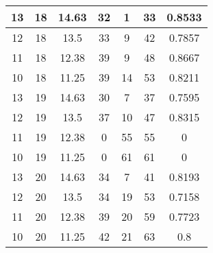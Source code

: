 \documentclass[letterpaper, 12pt]{article}
\begin{document}
\begin{longtable}{|c|c|c|c|c|c|c|}
\hline
13 & 18 & 14.63 & 32 & 1 & 33 & 0.8533 \\
\hline
12 & 18 & 13.5 & 33 & 9 & 42 & 0.7857 \\
\hline
11 & 18 & 12.38 & 39 & 9 & 48 & 0.8667 \\
\hline
10 & 18 & 11.25 & 39 & 14 & 53 & 0.8211 \\
\hline
13 & 19 & 14.63 & 30 & 7 & 37 & 0.7595 \\
\hline
12 & 19 & 13.5 & 37 & 10 & 47 & 0.8315 \\
\hline
11 & 19 & 12.38 & 0 & 55 & 55 & 0 \\
\hline
10 & 19 & 11.25 & 0 & 61 & 61 & 0 \\
\hline
13 & 20 & 14.63 & 34 & 7 & 41 & 0.8193 \\
\hline
12 & 20 & 13.5 & 34 & 19 & 53 & 0.7158 \\
\hline
11 & 20 & 12.38 & 39 & 20 & 59 & 0.7723 \\
\hline
10 & 20 & 11.25 & 42 & 21 & 63 & 0.8 \\
\hline
\end{longtable}
\end{document}
